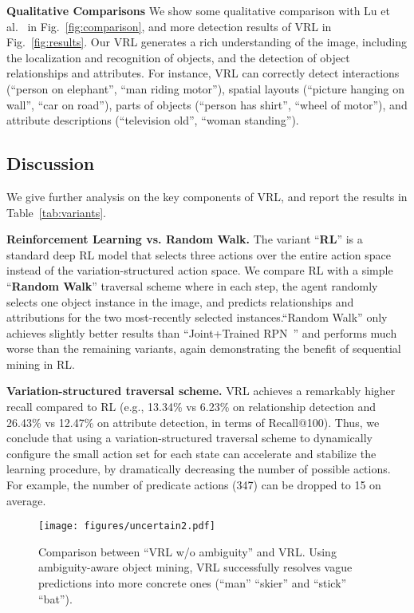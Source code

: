\documentclass[10pt,twocolumn,letterpaper]{article}
\begin{document}
\textbf{Qualitative Comparisons} We show some qualitative comparison with Lu et al.~\cite{lu2016visual} in Fig.~\ref{fig:comparison}, and more detection results of VRL in Fig.~\ref{fig:results}. Our VRL generates a rich understanding of the image, including the localization and recognition of objects, and the detection of object relationships and attributes. For instance, VRL can correctly detect interactions (``person on elephant'', ``man riding motor''), spatial layouts (``picture hanging on wall'', ``car on road''), parts of objects (``person has shirt'', ``wheel of motor''), and attribute descriptions (``television old'', ``woman standing''). 


 
\subsection{Discussion}
We give further analysis on the key components of VRL, and report the results in Table~\ref{tab:variants}.


\textbf{Reinforcement Learning vs. Random Walk.} The variant ``\textbf{RL}'' is a standard deep RL model that selects three actions over the entire action space instead of the variation-structured action space.  We compare RL with a simple ``\textbf{Random Walk}'' traversal scheme where in each step, the agent randomly selects one object instance in the image, and predicts relationships and attributions for the two most-recently selected instances.``Random Walk'' only achieves slightly better results than ``Joint+Trained RPN~\cite{ren2015faster}'' and performs much worse than the remaining variants, again demonstrating the benefit of sequential mining in RL. 

\textbf{Variation-structured traversal scheme.} VRL achieves a remarkably higher recall compared to RL (e.g., 13.34\% vs 6.23\% on relationship detection and 26.43\% vs 12.47\% on attribute detection, in terms of Recall@100). Thus, we conclude that using a variation-structured traversal scheme to dynamically configure the small action set for each state can accelerate and stabilize the learning procedure, by dramatically {decreasing} the number of possible actions. For example, the number of predicate actions (347) can be dropped to 15 on average.
\begin{figure}[!tp]
	\begin{center}
		\texttt{[image: figures/uncertain2.pdf]}
		\caption{{Comparison between ``VRL w/o ambiguity'' and VRL. Using ambiguity-aware object mining, VRL successfully resolves vague predictions into more concrete ones {(``man''  ``skier'' and ``stick''  ``bat'')}.}}
		\label{fig:ambiguity}
	\end{center}
	\vspace{-8mm}
\end{figure}
\end{document}
